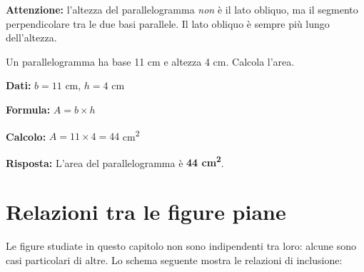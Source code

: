 \begin{attenzione}
    \textbf{Attenzione:} l'altezza del parallelogramma \emph{non} è il lato obliquo, ma il segmento perpendicolare tra le due basi parallele. Il lato obliquo è sempre più lungo dell'altezza.
\end{attenzione}

\begin{esempio}
    Un parallelogramma ha base 11 cm e altezza 4 cm. Calcola l'area.

    \medskip
    \textbf{Dati:} $b = 11$ cm, $h = 4$ cm

    \textbf{Formula:} $A = b \times h$

    \textbf{Calcolo:} $A = 11 \times 4 = 44$ cm\textsuperscript{2}

    \textbf{Risposta:} L'area del parallelogramma è \textbf{44 cm\textsuperscript{2}}.
\end{esempio}

\section{Relazioni tra le figure piane}

Le figure studiate in questo capitolo non sono indipendenti tra loro: alcune sono casi particolari di altre. Lo schema seguente mostra le relazioni di inclusione:

\begin{center}
\end{center}

